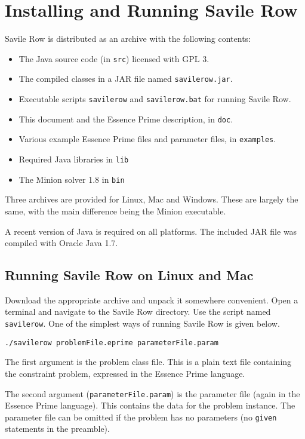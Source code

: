 \documentclass[a4paper]{article}
\newcommand{\eprime}{{\sc Essence Prime}\xspace}
\newcommand{\savilerow}{{\sc Savile Row}\xspace}
\begin{document}
\section{Installing and Running \savilerow}

\savilerow is distributed as an archive with the following contents: 

\begin{itemize}
\item The Java source code (in {\tt src}) licensed with GPL 3.
\item The compiled classes in a JAR file named {\tt savilerow.jar}.
\item Executable scripts {\tt savilerow} and {\tt savilerow.bat} for running \savilerow.
\item This document and the \eprime description, in {\tt doc}.
\item Various example \eprime files and parameter files, in {\tt examples}.
\item Required Java libraries in {\tt lib}
\item The Minion solver 1.8 in {\tt bin}
\end{itemize}

Three archives are provided for Linux, Mac and Windows. These are largely the same,
with the main difference being the Minion executable. 

A recent version of Java is required on all platforms. The included JAR file was
compiled with Oracle Java 1.7. 

\subsection{Running \savilerow on Linux and Mac}

Download the appropriate archive and unpack it somewhere convenient. Open a 
terminal and navigate to the \savilerow directory.  
Use the script named \texttt{savilerow}. One of
the simplest ways of running \savilerow is given below.

\begin{verbatim}
./savilerow problemFile.eprime parameterFile.param
\end{verbatim}

The first argument is the problem class file. This 
is a plain text file containing the constraint problem, expressed in the \eprime
language. 

The second argument ({\tt parameterFile.param}) is the parameter file (again in the 
\eprime language). This contains the data for the problem instance. 
The parameter file can be omitted if the problem has no parameters (no \texttt{given} statements in 
the preamble). 
\end{document}
